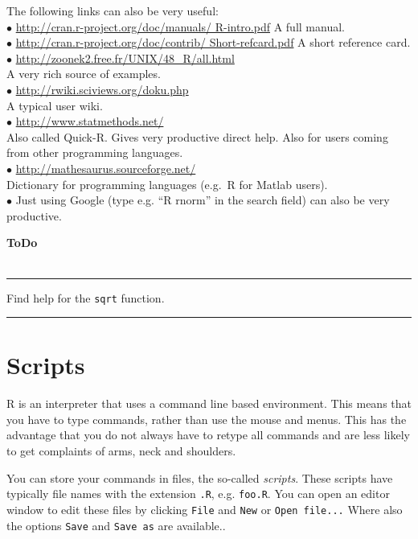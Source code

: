 \documentclass[a4paper,11pt,twocolumn,tablecaptionabove]{scrartcl}
\makeatletter
\newenvironment{ToDo} {%
  \begin{flushright}
    \hfill
    \begin{minipage}{0.95\columnwidth}         %
    \textsf{\textbf{ToDo}} \\
      \vspace{-0.85cm}\\
      {\color{Gray}\rule[-0.1cm]{\columnwidth}{1.5pt}}} { %
      {\color{Gray} \rule[0.3cm]{\columnwidth}{1.5pt}}
    \end{minipage}
    \vspace{1em}
  \end{flushright}
  }
\let\SF@@footnote\footnote
\def\footnote{\ifx\protect\@typeset@protect
 \expandafter\SF@@footnote
 \else
 \expandafter\SF@gobble@opt
 \fi
}
\edef\SF@gobble@opt{\noexpand\protect
 \expandafter\noexpand\csname SF@gobble@opt \endcsname}
\makeatother
\begin{document}
The following links can also be very useful:\\
\noindent $\bullet$ \url{http://cran.r-project.org/doc/manuals/ R-intro.pdf} A full manual.\\
\noindent $\bullet$ \url{http://cran.r-project.org/doc/contrib/ Short-refcard.pdf} A short reference card.\\
\noindent $\bullet$  \url{http://zoonek2.free.fr/UNIX/48\_R/all.html}\\
  A very rich source of examples.\\
\noindent $\bullet$  \url{http://rwiki.sciviews.org/doku.php}\\
  A typical user wiki.\\
\noindent $\bullet$ \url{http://www.statmethods.net/}\\
    Also called Quick-R. Gives very productive direct help. Also for users coming from other programming languages. \\
    \noindent $\bullet$ \url{http://mathesaurus.sourceforge.net/}\\
    Dictionary for programming languages (e.g.~R for Matlab users). \\
\noindent $\bullet$  Just using Google (type e.g. ``R rnorm'' in the search field) can also be very
productive.\\

\begin{ToDo}
Find help for the \texttt{sqrt} function.\\
\end{ToDo}


\section{Scripts}

R is an interpreter that uses a command line based environment. This means that you have to type
commands, rather than use the mouse and menus.  
This has the advantage that you do not always have to retype all commands and are less likely to get complaints of arms, neck and shoulders.

You can store your commands in files, the so-called \emph{scripts}.  
These scripts have typically file names with the extension
\texttt{.R}, e.g.  \texttt{foo.R}.  
You can open an editor window to edit these
files by clicking \texttt{File} and \texttt{New} or \texttt{Open file...}
\footnote{Where also the options \texttt{Save} and
  \texttt{Save as} are available.}.
\end{document}
